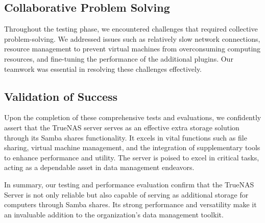 \subsection{Collaborative Problem Solving}

Throughout the testing phase, we encountered challenges that required collective problem-solving. We addressed issues such as relatively slow network connections, resource management to prevent virtual machines from overconsuming computing resources, and fine-tuning the performance of the additional plugins. Our teamwork was essential in resolving these challenges effectively.

\subsection{Validation of Success}

Upon the completion of these comprehensive tests and evaluations, we confidently assert that the TrueNAS server serves as an effective extra storage solution through its Samba shares functionality. It excels in vital functions such as file sharing, virtual machine management, and the integration of supplementary tools to enhance performance and utility. The server is poised to excel in critical tasks, acting as a dependable asset in data management endeavors.

In summary, our testing and performance evaluation confirm that the TrueNAS Server is not only reliable but also capable of serving as additional storage for computers through Samba shares. Its strong performance and versatility make it an invaluable addition to the organization's data management toolkit.
